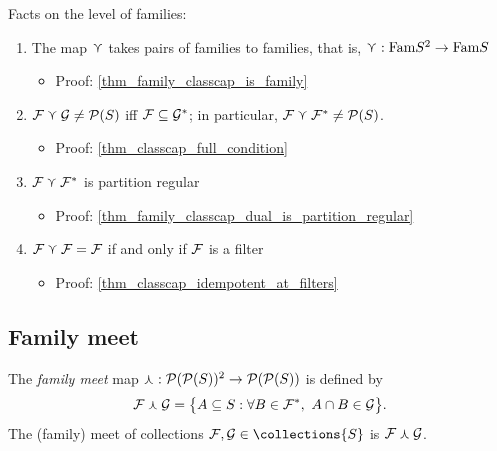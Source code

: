 \vskip0.5cm

Facts on the level of families:
\begin{enumerate}
    \item The map $\curlyvee$ takes pairs of families to families, that is, $\curlyvee: \text{Fam}{S}^2 \to \text{Fam}{S}$
    \begin{itemize}
        \item Proof: \cref{thm_family_classcap_is_family}
    \end{itemize}

    \item {}  $\mathcal{F} \curlyvee \mathcal{G} \neq \mathcal{P}(S)$ iff $\mathcal{F} \subseteq \mathcal{G}^*$; in particular, $\mathcal{F} \curlyvee \mathcal{F}^* \neq \mathcal{P}(S)$.
    \begin{itemize}
        \item Proof: \cref{thm_classcap_full_condition}
    \end{itemize}

    \item $\mathcal{F} \curlyvee \mathcal{F}^*$ is partition regular
    \begin{itemize}
        \item Proof: \cref{thm_family_classcap_dual_is_partition_regular}
    \end{itemize}

    \item $\mathcal{F} \curlyvee \mathcal{F} = \mathcal{F}$ if and only if $\mathcal{F}$ is a filter
    \begin{itemize}
        \item Proof: \cref{thm_classcap_idempotent_at_filters}
    \end{itemize}

\end{enumerate}

\subsection{Family meet}

\begin{definition}
     The \emph{family meet} map $\curlywedge: \mathcal{P}(\mathcal{P}(S))^2 \to \mathcal{P}(\mathcal{P}(S))$ is defined by
    \[\mathcal{F} \curlywedge \mathcal{G} = \big\{A \subseteq S : \forall B \in \mathcal{F}^*, \ A \cap B \in \mathcal{G} \big\}.\]
    The (family) meet of collections $\family, \familytwo \in \collections{S}$ is $\mathcal{F} \curlywedge \mathcal{G}$.
\end{definition}

